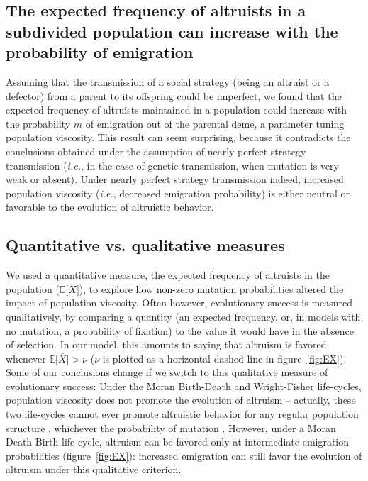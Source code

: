 \documentclass[11pt, letterpaper]{article}
\newcommand{\ie}{\textit{i.e.}}
\newcommand{\Esp}[1]{\mathbb{E}\big[ #1\big]}%
\newcommand{\mutbias}{\nu}
\begin{document}
\subsection*{The expected frequency of altruists in a subdivided population can increase with the probability of emigration}
Assuming that the transmission of a social strategy (being an altruist or a defector) from a parent to its offspring could be imperfect, we found that the expected frequency of altruists maintained in a population could increase with the probability $m$ of emigration out of the parental deme, a parameter tuning population viscosity. This result can seem surprising, because it contradicts the conclusions obtained under the assumption of nearly perfect strategy transmission (\ie, in the case of genetic transmission, when mutation is very weak or absent). Under nearly perfect strategy transmission indeed, increased population viscosity (\ie, decreased emigration probability) is either neutral \citep[][and dashed lines in figures~\ref{fig:EX}--]{Taylor1992islandmodel} or favorable \citep[][and dashed lines in figure~\ref{fig:EX}]{TaylorDayWild2007} to the evolution of altruistic behavior. 

\subsection*{Quantitative vs. qualitative measures}
We used a quantitative measure, the expected frequency of altruists in the population ($\Esp{\overline{X}}$), to explore how non-zero mutation probabilities altered the impact of population viscosity. Often however, evolutionary success is measured qualitatively, by comparing a quantity (an expected frequency, or, in models with no mutation, a probability of fixation) to the value it would have in the absence of selection. In our model, this amounts to saying that altruism is favored whenever $\Esp{\overline{X}} > \mutbias$ ($\mutbias$ is plotted as a horizontal dashed line in figure~\ref{fig:EX}). 
Some of our conclusions change if we switch to this qualitative measure of evolutionary success: Under the Moran Birth-Death and Wright-Fisher life-cycles, population viscosity does not promote the evolution of altruism -- actually, these two life-cycles cannot ever promote altruistic behavior for any regular population structure \citep{Taylor2011}, whichever the probability of mutation \citep{Debarre2017}. 
However, under a Moran Death-Birth life-cycle, altruism can be favored only at intermediate emigration probabilities (figure~\ref{fig:EX}): increased emigration can still favor the evolution of altruism under this qualitative criterion.  
\end{document}
